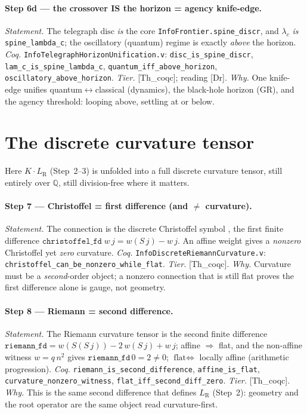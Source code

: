 \documentclass[10pt,twocolumn]{article}
\theoremstyle{definition}
\newcommand{\Thq}{\textsf{[Th\_coqc]}}   %
\newcommand{\Dr}{\textsf{[Dr]}}          %
\newcommand{\code}[1]{\texttt{#1}}
\newcommand{\LR}{L_{\mathrm R}}
\begin{document}
\paragraph{Step 6d --- the crossover IS the horizon = agency knife-edge.}
\emph{Statement.} The telegraph $\mathrm{disc}$ \emph{is} the core
\code{InfoFrontier.spine\_discr}, and $\lambda_c$ \emph{is}
\code{spine\_lambda\_c}; the oscillatory (quantum) regime is exactly
\emph{above} the horizon. \emph{Coq.}
\code{InfoTelegraphHorizonUnification.v}: \code{disc\_is\_spine\_discr},
\code{lam\_c\_is\_spine\_lambda\_c}, \code{quantum\_iff\_above\_horizon},
\code{oscillatory\_above\_horizon}. \emph{Tier.} \Thq{}; reading \Dr{}.
\emph{Why.} One knife-edge unifies quantum$\leftrightarrow$classical (dynamics),
the black-hole horizon (GR), and the agency threshold: looping above, settling
at or below.

\section{The discrete curvature tensor}\label{sec:curvature}
Here $K\!\cdot\!\LR$ (Step~2--3) is unfolded into a full discrete curvature
tensor, still entirely over $\mathbb{Q}$, still division-free where it matters.

\paragraph{Step 7 --- Christoffel = first difference (and $\neq$ curvature).}
\emph{Statement.} The connection is the discrete Christoffel symbol
\cite{christoffel1869}, the first finite difference
$\code{christoffel\_fd}\;w\,j=w(S\,j)-w\,j$. An affine weight gives a
\emph{nonzero} Christoffel yet \emph{zero} curvature. \emph{Coq.}
\code{InfoDiscreteRiemannCurvature.v}:
\code{christoffel\_can\_be\_nonzero\_while\_flat}. \emph{Tier.} \Thq{}.
\emph{Why.} Curvature must be a \emph{second}-order object; a nonzero connection
that is still flat proves the first difference alone is gauge, not geometry.

\paragraph{Step 8 --- Riemann = second difference.}
\emph{Statement.} The Riemann curvature tensor \cite{riemann1868} is the second
finite difference $\code{riemann\_fd}=w(S(S\,j))-2\,w(S\,j)+w\,j$; affine
$\Rightarrow$ flat, and the non-affine witness $w=q\,n^2$ gives
$\code{riemann\_fd}\,0=2\neq0$; $\text{flat}\Leftrightarrow$ locally affine
(arithmetic progression). \emph{Coq.} \code{riemann\_is\_second\_difference},
\code{affine\_is\_flat}, \code{curvature\_nonzero\_witness},
\code{flat\_iff\_second\_diff\_zero}. \emph{Tier.} \Thq{}. \emph{Why.} This is
the same second difference that defines $\LR$ (Step~2): geometry and the root
operator are the same object read curvature-first.
\end{document}
